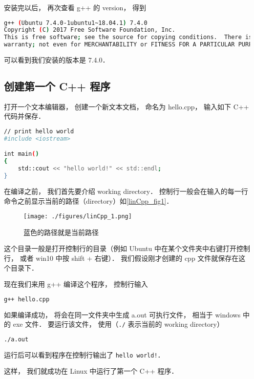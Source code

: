 安装完以后， 再次查看 g++ 的 version， 得到
\begin{lstlisting}[language=bash]
g++ (Ubuntu 7.4.0-1ubuntu1~18.04.1) 7.4.0
Copyright (C) 2017 Free Software Foundation, Inc.
This is free software; see the source for copying conditions.  There is NO
warranty; not even for MERCHANTABILITY or FITNESS FOR A PARTICULAR PURPOSE.
\end{lstlisting}
可以看到我们安装的版本是 7.4.0．


\subsection{创建第一个 C++ 程序}
打开一个文本编辑器， 创建一个新文本文档， 命名为 hello.cpp， 输入如下 C++ 代码并保存．
\begin{lstlisting}[language=bash]
// print hello world
#include <iostream>

int main()
{
    std::cout << "hello world!" << std::endl;
}
\end{lstlisting}
在编译之前， 我们首先要介绍 working directory． 控制行一般会在输入的每一行命令之前显示当前的路径（directory）如\autoref{linCpp_fig1}．
\begin{figure}[ht]
\centering
\texttt{[image: ./figures/linCpp\_1.png]}
\caption{蓝色的路径就是当前路径} \label{linCpp_fig1}
\end{figure}

这个目录一般是打开控制行的目录（例如 Ubuntu 中在某个文件夹中右键打开控制行， 或者 win10 中按 shift + 右键）． 我们假设刚才创建的 cpp 文件就保存在这个目录下．

现在我们来用 g++ 编译这个程序， 控制行输入
\begin{lstlisting}[language=bash]
g++ hello.cpp
\end{lstlisting}
如果编译成功， 将会在同一文件夹中生成 a.out 可执行文件， 相当于 windows 中的 exe 文件． 要运行该文件， 使用（\verb|./| 表示当前的 working directory）
\begin{lstlisting}[language=bash]
./a.out
\end{lstlisting}
运行后可以看到程序在控制行输出了 \verb|hello world!|．

这样， 我们就成功在 Linux 中运行了第一个 C++ 程序．
